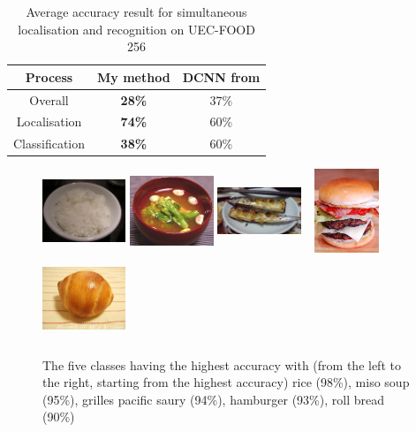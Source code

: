 \begin{table}
    \centering
    \renewcommand{\arraystretch}{1.2}
    \begin{tabulary}{\textwidth}{| c | C C|}
        \hline
        Process & My method & DCNN from \cite{Bolanos2016} \\
        \hline
        Overall & \textbf{28\%} & 37\% \\ 
        \hline
        Localisation &  \textbf{74\%} & 60\% \\
        \hline
        Classification &  \textbf{38\%} & 60\% \\
        \hline
    \end{tabulary}
    \caption{Average accuracy result for simultaneous localisation and recognition on UEC-FOOD 256}
    \label{table:uecfodd256_results}
\end{table}

\begin{figure}
    \centering
    \includegraphics[height=2.5cm, width=2.5cm]{img/top_rice.jpg}
    \includegraphics[height=2.5cm, width=2.5cm]{img/top_miso_soup.jpg}
    \includegraphics[height=2.5cm, width=2.5cm]{img/top_grilled_pacific_saury.jpg}
    \includegraphics[height=2.5cm, width=2.5cm]{img/top_hamburger.jpg}
    \includegraphics[height=2.5cm, width=2.5cm]{img/top_roll_bread.jpg}
    \caption[Classes having the highest accuracy]{The five classes having the highest accuracy with (from the left to the right, starting from the highest accuracy) rice (98\%), miso soup (95\%), grilles pacific saury (94\%), hamburger (93\%), roll bread (90\%)}
    \label{fig:top_5}
\end{figure}

